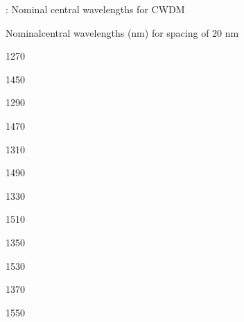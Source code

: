 \documentclass[letterpaper,10pt,english]{sphinxmanual}
\begin{document}
: Nominal central wavelengths for CWDM









Nominalcentral wavelengths (nm) for spacing of 20 nm









1270





1450









1290





1470









1310





1490









1330





1510









1350





1530









1370





1550
\end{document}
